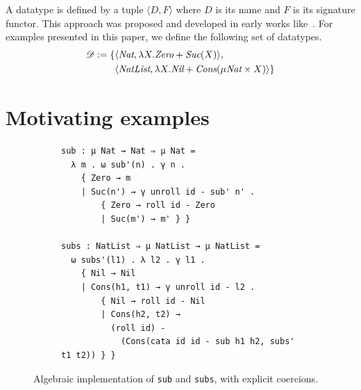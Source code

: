 \documentclass[runningheads]{llncs}
\begin{document}
%


A datatype is defined by a tuple $\langle D , F \rangle$ where $D$ is
its name and $F$ is its signature functor.  This approach was proposed
and developed in early works like~\cite{hagino87,goguen+77}.  For
examples presented in this paper, we define the following set of
datatypes.
\begin{align*}
  \mathscr{D} := \{
    & \langle \textit{Nat} , \lambda X . \textit{Zero} + \textit{Suc}(X) \rangle, \\
    & \langle \textit{NatList}, \lambda X . \textit{Nil} + \textit{Cons}(\mu \textit{Nat} \times X) \rangle
  \}
\end{align*}

\section{Motivating examples}
\label{sec:motivating-examples}

\begin{figure}[tb]
  \centering

  \begin{subfigure}[t]{1.0\textwidth}
  \begin{verbatim}
sub : μ Nat → Nat ⇒ μ Nat =
  λ m . ω sub'(n) . γ n .
    { Zero → m
    | Suc(n') → γ unroll id - sub' n' .
        { Zero → roll id - Zero
        | Suc(m') → m' } }

subs : NatList ⇒ μ NatList → μ NatList =
  ω subs'(l1) . λ l2 . γ l1 .
    { Nil → Nil
    | Cons(h1, t1) → γ unroll id - l2 .
        { Nil → roll id - Nil
        | Cons(h2, t2) →
          (roll id) -
            (Cons(cata id id - sub h1 h2, subs' t1 t2)) } }
  \end{verbatim}
  \end{subfigure}
  \caption{Algebraic implementation of \texttt{sub} and \texttt{subs}, with explicit coercions. }
  \label{fig:example-subs-algebraic-with-coercions}
\end{figure}
\end{document}
